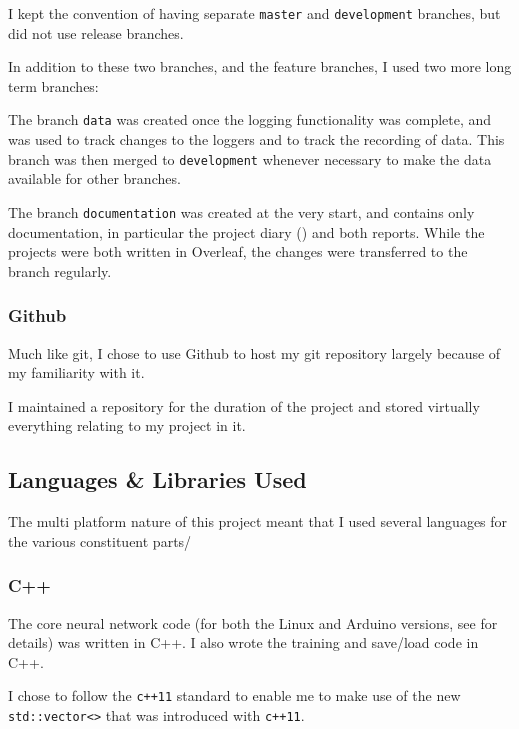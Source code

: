 \documentclass[a4paper]{article}
\begin{document}
I kept the convention of having separate \lstinline{master} and \lstinline{development} branches, but did not use release branches. 

In addition to these two branches, and the feature branches, I used two more long term branches:

The branch \lstinline{data} was created once the logging functionality was complete, and was used to track changes to the loggers and to track the recording of data. This branch was then merged to \lstinline{development} whenever necessary to make the data available for other branches.

The branch \lstinline{documentation} was created at the very start, and contains only documentation, in particular the project diary () and both reports. While the projects were both written in Overleaf, the changes were transferred to the branch regularly.

\subsubsection{Github}

Much like git, I chose to use Github\cite{ppref2} to host my git repository largely because of my familiarity with it. 

I maintained a repository\cite{ppref3} for the duration of the project and stored virtually everything relating to my project in it.

\subsection{Languages \& Libraries Used}%

The multi platform nature of this project meant that I used several languages for the various constituent parts/

\subsubsection{C++}

The core neural network code (for both the Linux and Arduino versions, see  for details) was written in C++\cite{ppref4}. I also wrote the training and save/load code in C++.

I chose to follow the \lstinline{c++11}\cite{ppref5} standard to enable me to make use of the new \lstinline{std::vector<>} that was introduced with \lstinline{c++11}.
\end{document}
